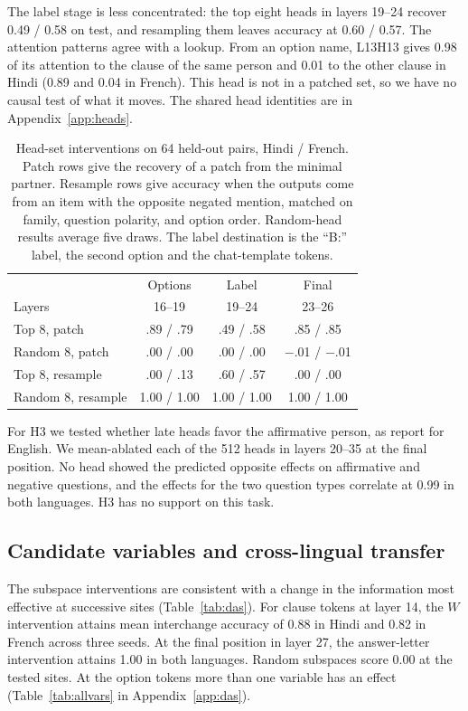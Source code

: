 \documentclass[11pt]{article}
\begin{document}
The label stage is less concentrated: the top eight heads in layers 19--24 recover 0.49 / 0.58 on test, and resampling them leaves accuracy at 0.60 / 0.57. The attention patterns agree with a lookup. From an option name, L13H13 gives 0.98 of its attention to the clause of the same person and 0.01 to the other clause in Hindi (0.89 and 0.04 in French). This head is not in a patched set, so we have no causal test of what it moves. The shared head identities are in Appendix~\ref{app:heads}.

\begin{table}[t]
\small\centering
\begin{tabularx}{\linewidth}{@{}Xccc@{}}
\toprule
 & Options & Label & Final \\
Layers & 16--19 & 19--24 & 23--26 \\
\midrule
Top 8, patch & .89 / .79 & .49 / .58 & .85 / .85 \\
Random 8, patch & .00 / .00 & .00 / .00 & $-$.01 / $-$.01 \\
Top 8, resample & .00 / .13 & .60 / .57 & .00 / .00 \\
Random 8, resample & 1.00 / 1.00 & 1.00 / 1.00 & 1.00 / 1.00 \\
\bottomrule
\end{tabularx}
\caption{Head-set interventions on 64 held-out pairs, Hindi / French. Patch rows give the recovery of a patch from the minimal partner. Resample rows give accuracy when the outputs come from an item with the opposite negated mention, matched on family, question polarity, and option order. Random-head results average five draws. The label destination is the ``B:'' label, the second option and the chat-template tokens.}
\label{tab:heads}
\end{table}

For H3 we tested whether late heads favor the affirmative person, as \citet{zhou2026negation} report for English. We mean-ablated each of the 512 heads in layers 20--35 at the final position. No head showed the predicted opposite effects on affirmative and negative questions, and the effects for the two question types correlate at 0.99 in both languages. H3 has no support on this task.

\subsection{Candidate variables and cross-lingual transfer}
\label{sec:subspaces}
The subspace interventions are consistent with a change in the information most effective at successive sites (Table~\ref{tab:das}). For clause tokens at layer 14, the $W$ intervention attains mean interchange accuracy of 0.88 in Hindi and 0.82 in French across three seeds. At the final position in layer 27, the answer-letter intervention attains 1.00 in both languages. Random subspaces score 0.00 at the tested sites. At the option tokens more than one variable has an effect (Table~\ref{tab:allvars} in Appendix~\ref{app:das}).
\end{document}

